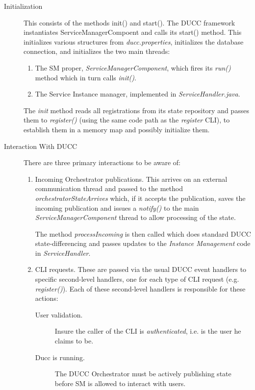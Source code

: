    \begin{description}
     \item[Initialization] This consists of the methods init() and
       start(). The DUCC framework instantiates ServiceManagerCompoent and calls
       its start() method.  This initializes various structures from
       {\em ducc.properties}, initializes the database connection, and
       initializes the two main threads:
       \begin{enumerate}
         \item The SM proper, {\em ServiceManagerComponent}, which
           fires its {\em run()} method which in turn calls {\em init()}.
           \item The Service Instance manager, implemented in {\em ServiceHandler.java}.
       \end{enumerate}
       The {\em init} method reads all registrations from its state repository and
       passes them to {\em register()} (using the same code path as the {\em register} CLI),
       to establish them in a memory map and possibly initialize them.


       \item[Interaction With DUCC] There are three primary interactions to be aware of:
         \begin{enumerate}
           \item Incoming Orchestrator publications.  This arrives on an external
             communication thread  and passed to
             the method {\em orchestratorStateArrives} which, if it accepts the
             publication, saves the incoming publication and issues a {\em notify()} to 
             the main {\em ServiceManagerComponent} thread to allow processing of the state.  

             The method {\em processIncoming} is then called which does standard DUCC
             state-differencing and passes updates to the {\em Instance Management} code
             in {\em ServiceHandler}.

           \item CLI requests.  These are passed via the usual DUCC event handlers to specific
             second-level handlers, one for each type of CLI request (e.g. {\em register()}).  Each of these
             second-level handlers is responsible for these actions:
             \begin{description}
               \item[User validation.]  Insure the caller of the CLI is {\em authenticated}, i.e.
                 is the user he claims to be.
               \item[Ducc is running.]  The DUCC Orchestrator must be actively publishing state
                 before SM is allowed to interact with users.                 
             \end{description}
             

\end{enumerate}
\end{description}
